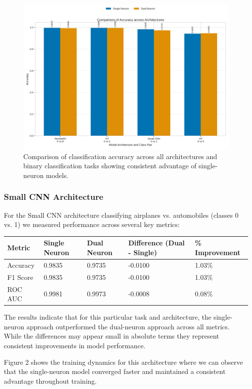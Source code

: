 \documentclass[11pt]{article}
\begin{document}
\begin{figure}[htbp]
\centering
\includegraphics[width=\textwidth]{figures/accuracy_comparison.png}
\caption{Comparison of classification accuracy across all architectures and binary classification tasks showing consistent advantage of single-neuron models.}
\end{figure}

\subsubsection{Small CNN Architecture}
For the Small CNN architecture classifying airplanes vs. automobiles (classes 0 vs. 1) we measured performance across several key metrics:

\begin{tabular}{lllll}
\hline
Metric & Single Neuron & Dual Neuron & Difference (Dual - Single) & \% Improvement \\
\hline
Accuracy & 0.9835 & 0.9735 & -0.0100 & 1.03\% \\
F1 Score & 0.9835 & 0.9735 & -0.0100 & 1.03\% \\
ROC AUC & 0.9981 & 0.9973 & -0.0008 & 0.08\% \\
\hline
\end{tabular}

The results indicate that for this particular task and architecture, the single-neuron approach outperformed the dual-neuron approach across all metrics. While the differences may appear small in absolute terms they represent consistent improvements in model performance.

Figure 2 shows the training dynamics for this architecture where we can observe that the single-neuron model converged faster and maintained a consistent advantage throughout training.
\end{document}
